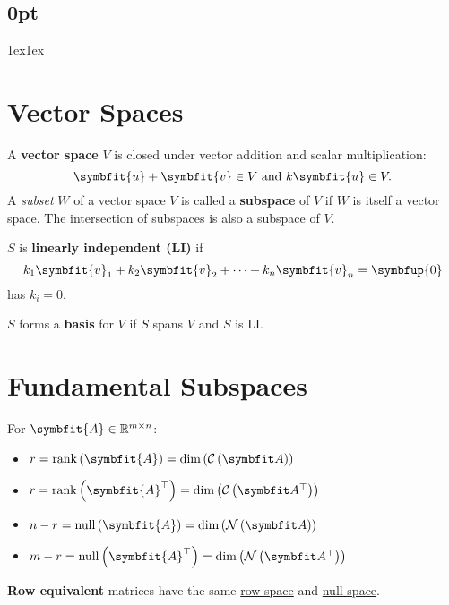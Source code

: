 \documentclass{article}
\begin{document}
\titlespacing*\subsection{0pt}{1ex}{1ex}
\setlength{\textfloatsep}{0pt}
\setlength{\abovedisplayskip}{1pt}
\setlength{\belowdisplayskip}{1pt}
\begin{minipage}[t]{62.39259259mm}
    \section*{Vector Spaces}
    A \textbf{vector space} $V$ is closed under vector addition
    and scalar multiplication:
    \begin{equation*}
        \symbfit{u}+\symbfit{v} \in V \ \text{and} \ k\symbfit{u} \in V.
    \end{equation*}
    A \textit{subset} $W$ of a vector space $V$ is called a
    \textbf{subspace} of $V$ if $W$ is itself a vector space. The
    intersection of subspaces is also a subspace of $V$.

    $S$ is \textbf{linearly independent (LI)} if
    \begin{equation*}
        k_1 \symbfit{v}_1 + k_2 \symbfit{v}_2 + \cdots + k_n \symbfit{v}_n = \symbfup{0}
    \end{equation*}
    has $k_i=0$.

    $S$ forms a \textbf{basis} for $V$ if $S$ spans $V$ and
    $S$ is LI.
    \section*{Fundamental Subspaces}
    For $\symbfit{A}\in\mathbb{R}^{m \times n}$:
    \begin{itemize}
        \item $r = \rank{\left( \symbfit{A} \right)} = \dim{\left( \columnspace{A} \right)}$
        \item $r = \rank{\left( \symbfit{A}^\top \right)} = \dim{\left( \rowspace{A} \right)}$
        \item $n - r = \vnull{\left( \symbfit{A} \right)}      = \dim{\left( \nullspace{A} \right)}$
        \item $m - r = \vnull{\left( \symbfit{A}^\top \right)} = \dim{\left( \leftnullspace{A} \right)}$
    \end{itemize}
    \textbf{Row equivalent} matrices have the same
    \underline{row space} and \underline{null space}.

\end{minipage}
\end{document}
